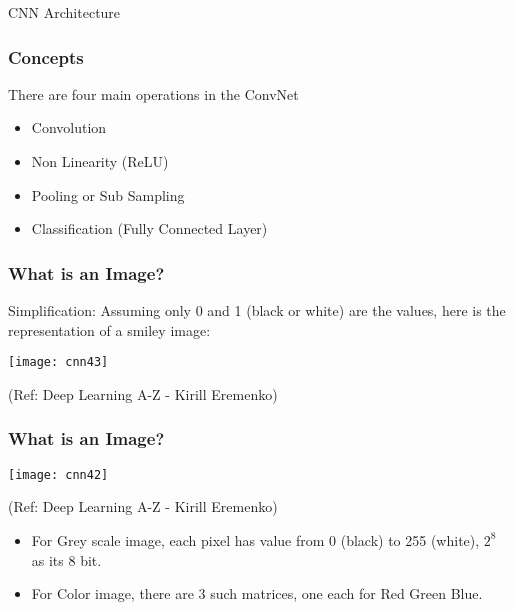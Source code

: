 \begin{frame}
  \begin{center}
    {\Large CNN Architecture}
  \end{center}
\end{frame}

\begin{frame}[fragile] \frametitle{Concepts}
There are four main operations in the ConvNet 

\begin{itemize}
\item Convolution
\item Non Linearity (ReLU)
\item Pooling or Sub Sampling
\item Classification (Fully Connected Layer)
\end{itemize}
\end{frame}



\begin{frame}[fragile] \frametitle{What is an Image?}
Simplification: Assuming only 0 and 1 (black or white) are the values, here is the representation of a smiley image:

\begin{center}
\texttt{[image: cnn43]}

\tiny{(Ref: Deep Learning A-Z - Kirill Eremenko)}
\end{center}



\end{frame}



\begin{frame}[fragile] \frametitle{What is an Image?}

\begin{center}
\texttt{[image: cnn42]}

\tiny{(Ref: Deep Learning A-Z - Kirill Eremenko)}
\end{center}

\begin{itemize}
\item For Grey scale image, each pixel has value from 0 (black) to 255 (white), $2^8$ as its 8 bit.
\item For Color image, there are 3 such matrices, one each for Red Green Blue.
\end{itemize}


\end{frame}


